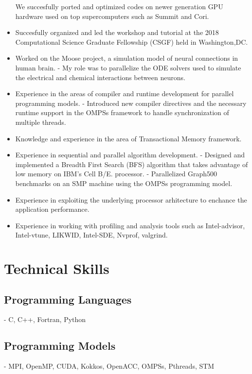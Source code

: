 \documentclass[margin]{res}
\begin{document}
\begin{resume}
\begin{itemize}
          We succesfully ported and optimized codes on newer generation GPU hardware used on top supercomputers such as Summit and Cori.
      \item Succesfully organized and led the workshop and tutorial at the 2018 Computational Science Graduate Fellowship (CSGF) held in Washington,DC.
	   \item Worked on the Moose project, a simulation model of neural connections in human brain.
			 \subitem - My role was to parallelize the ODE solvers used to simulate the electrical and chemical interactions between neurons.
	   \item Experience in the areas of compiler and runtime development for parallel programming models.
			 \subitem - Introduced new compiler directives and the necessary runtime support in the OMPSs framework to handle synchronization of multiple threads.
	   \item Knowledge and experience in the area of Transactional Memory framework.
	   \item  Experience in sequential and parallel algorithm development.
			 \subitem  - Designed and implemented a Breadth First Search (BFS) algorithm that takes advantage of low memory on IBM's Cell B/E. processor.
			 \subitem  - Parallelized Graph500 benchmarks on an SMP machine using the OMPSs programming model.
%
%
	   \item Experience in exploiting the underlying processor arhitecture to enchance the application performance.
%
	   \item Experience in working with profiling and analysis tools such as Intel-advisor, Intel-vtune, LIKWID, Intel-SDE, Nvprof, valgrind.
%
  \end{itemize}

\section{Technical Skills}

    \subsection{Programming Languages} - C, C++, Fortran, Python
    \subsection{Programming Models} - MPI, OpenMP, CUDA, Kokkos, OpenACC, OMPSs, Pthreads, STM

\end{resume}
\end{document}
